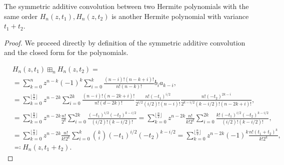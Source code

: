 \begin{proposition}
The symmetric additive convolution between two Hermite polynomials with the same order $H_n(z,t_1), H_n(z,t_2)$ is another Hermite polynomial with variance $t_1 + t_2$.
\end{proposition}

\begin{proof} We proceed directly by definition of the symmetric additive convolution and the closed form for the polynomials.

    \begin{align*}
        &H_n(z,t_1) \boxplus_n H_n(z,t_2) = \\ 
        &= \sum_{k=0}^n z^{n-k}(-1)^k \sum_{i=0}^k \frac{(n-i)!(n-k+i)!}{n!(n-k)!} b_i a_{k-i}, \\ 
        &= \sum_{k=0}^{\lfloor \frac n2 \rfloor} z^{n-2k} \sum_{i=0}^{2k} \frac{(n-i)!(n-2k+i)!}{n!(d-2k)!} \frac{n!(-t_1)^{i/2}}{2^{i/2} (i/2)! (n-i)!} \frac{n!(-t_2)^{2k-i}}{2^{k-i/2} (k-i/2)! (n-2k+i)!},\\ 
        &= \sum_{k=0}^{\lfloor \frac n2 \rfloor} z^{n-2k}\frac{n!}{2^k} \sum_{i=0}^{2k} \frac{(-t_1)^{i/2}(-t_2)^{k-i/2}}{(i/2)!(k-i/2)!} = \sum_{k=0}^{\lfloor \frac n2 \rfloor} z^{n-2k} \frac{n!}{k!2^k} \sum_{i=0}^{2k} \frac{k!(-t_1)^{i/2}(-t_2)^{k-i/2}}{(i/2)!(k-i/2)!}, \\ 
        &= \sum_{k=0}^{\lfloor \frac n2 \rfloor} z^{n-2k}\frac{n!}{k!2^k} \sum_{i=0}^{k} \binom{k}{i}(-t_1)^{i/2}(-t_2)^{k-i/2} = \sum_{k=0}^{\lfloor \frac n2 \rfloor} z^{n-2k}(-1)^{k} \frac{n!(t_1 + t_2)^k }{k!2^k},\\ 
        &\eqcolon H_n(z,t_1+t_2).
    \end{align*}\end{proof}





